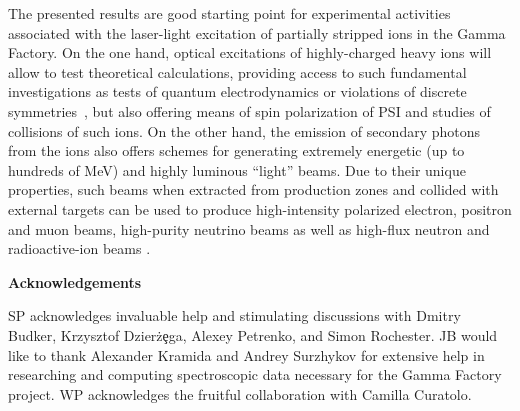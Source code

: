 \documentclass[superscriptaddress,
amsmath,amssymb%
pra,twocolumn,
floatfix
]{revtex4-2}
\begin{document}
The presented results are good starting point for experimental activities associated with the laser-light excitation of partially stripped ions in the Gamma Factory.  On the one hand, optical excitations of highly-charged heavy ions will allow to test theoretical calculations, providing access to such fundamental investigations as tests of quantum electrodynamics or violations of discrete symmetries~\cite{Budker2020Atomic}, but also offering means of spin polarization of PSI and studies of collisions of such ions.  On the other hand, the emission of secondary photons from the ions also offers schemes for generating extremely energetic (up to hundreds of MeV) and highly luminous ``light'' beams.  Due to their unique properties, such beams when extracted from production zones and collided with external targets can be used to produce high-intensity polarized electron, positron and muon beams, high-purity neutrino beams as well as high-flux neutron and radioactive-ion beams \cite{GF-PoP-LoI:2019,Placzek:2019xpw,GammaFactoryWorkingGroup:2020ely}.

\medskip
\textbf{Acknowledgements} \par 
SP acknowledges invaluable help and stimulating discussions with Dmitry Budker, Krzysztof Dzier\.z\c{e}ga, Alexey Petrenko, and Simon Rochester.  JB would like to thank Alexander Kramida and Andrey Surzhykov for extensive help in researching and computing spectroscopic data necessary for the Gamma Factory project.  WP acknowledges the fruitful collaboration with Camilla Curatolo.

\medskip



\end{document}
